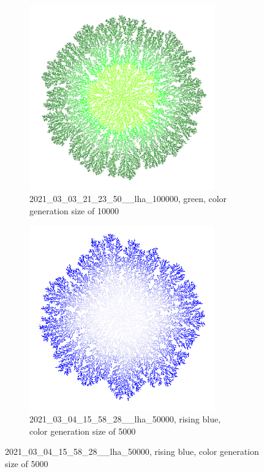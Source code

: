 \documentclass[12pt,a4paper]{scrartcl}
\newcommand{\1}{\mathbbm{1}}
\theoremstyle{definition}
\numberwithin{equation}{section}
\begin{document}
\newpage

\begin{figure}[h!]
	\centering
	\begin{subfigure}[b]{.49\textwidth}
		\includegraphics[height=8cm]{images/ia/2021_03_03_21_23_50___100000__10000__8923.png}
		\caption{2021\_03\_03\_21\_23\_50\_\_lha\_100000, green, color generation size of 10000}
	\end{subfigure}
	\begin{subfigure}[b]{.49\textwidth}
		\includegraphics[height=8cm]{images/ia/2021_03_04_15_58_28___50000__5000__5250.png}
		\caption{2021\_03\_04\_15\_58\_28\_\_lha\_50000, rising blue, color generation size of 5000}
	\end{subfigure}
\end{figure}

\vspace*{\fill}
\end{document}
